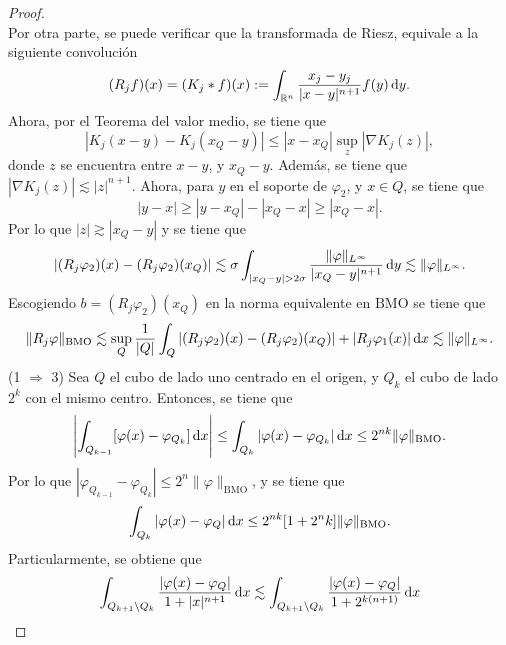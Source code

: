 \begin{proof}
\begin{equation}
	\end{equation}
	Por otra parte, se puede verificar que la transformada de Riesz, equivale a la siguiente convolución
	\begin{equation*}
		(R_jf)(x) = (K_j*f)(x) := \int_{\mathbb{R}^n} \frac{x_j-y_j}{|x-y|^{n+1}} f(y) \mathop{}\!\mathrm{d} y.
	\end{equation*}
	Ahora, por el Teorema del valor medio, se tiene que 
	\begin{equation*}
		|K_j(x-y)-K_j(x_Q-y)| \leq |x-x_Q| \sup_z |\nabla K_j(z)|,
	\end{equation*}
	donde $z$ se encuentra entre $x-y$, y $x_Q - y$. Además, se tiene que $|\nabla K_j(z)| \lesssim |z|^{n+1}$. Ahora, para $y$ en el soporte de $\varphi_2$, y $x\in Q$, se tiene que 
	\begin{equation*}
		|y-x| \geq |y-x_Q| - |x_Q-x| \geq |x_Q - x|.
	\end{equation*}
	Por lo que $|z| \gtrsim |x_Q - y|$ y se tiene que 
	\begin{equation}\label{eq:Rj-diff-L-infty}
		|(R_j\varphi_2)(x) - (R_j\varphi_2)(x_Q)| \lesssim \sigma \int_{|x_Q-y|>2\sigma} \frac{\|\varphi\|_{L^\infty}}{|x_Q - y|^{n+1}}\diff y \lesssim \|\varphi\|_{L^\infty}. 
	\end{equation}
	Escogiendo $b=(R_j\varphi_2)(x_Q)$ en la norma equivalente en $\mathrm{BMO}$ se tiene que 
	\begin{equation*}
		\|R_j\varphi\|_{\mathrm{BMO}} \lesssim \sup_Q \frac{1}{|Q|} \int_Q |(R_j\varphi_2)(x) - (R_j\varphi_2)(x_Q)| + |R_j\varphi_1(x)| \mathop{}\!\mathrm{d} x \lesssim \|\varphi\|_{L^\infty}.
	\end{equation*}
	(1 $\Rightarrow$ 3) Sea $Q$ el cubo de lado uno centrado en el origen, y $Q_k$ el cubo de lado $2^k$ con el mismo centro. Entonces, se tiene que
	\begin{equation*}
		\left| \int_{Q_{k-1}}[\varphi(x) - \varphi_{Q_k}] \mathop{}\!\mathrm{d} x
		\right| \leq \int_{Q_k} |\varphi(x) - \varphi_{Q_k}| \mathop{}\!\mathrm{d} x \leq 2^{nk}\|\varphi\|_{\mathrm{BMO}}.
	\end{equation*}
	Por lo que $|\varphi_{Q_{k-1}} - \varphi_{Q_k}| \leq 2^n\|\varphi\|_{\mathrm{BMO}}$, y se tiene que
	\begin{equation*}
		\int_{Q_k} |\varphi(x)-\varphi_Q| \mathop{}\!\mathrm{d} x \leq 2^{nk}[1+2^nk] \|\varphi\|_{\mathrm{BMO}}.
	\end{equation*}
	Particularmente, se obtiene que
	\begin{align*}
		\int_{Q_{k+1}\setminus Q_k} \frac{|\varphi(x)-\varphi_Q|}{1+|x|^{n+1}} \diff x & \lesssim \int_{Q_{k+1}\setminus Q_k} \frac{|\varphi(x)-\varphi_Q|}{1+2^{k(n+1)}} \diff x \\

\end{align*}
\end{proof}
